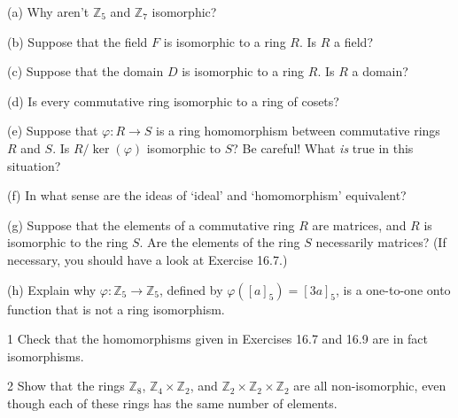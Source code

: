 \begin{problem}[Warmup]{(a)}
    Why aren't $\mathbb{Z}_5$ and $\mathbb{Z}_7$ isomorphic?
\end{problem}
\unsolved

\begin{problem}[Warmup]{(b)}
    Suppose that the field $F$ is isomorphic to a ring $R$. Is $R$ a field?
\end{problem}
\unsolved

\begin{problem}[Warmup]{(c)}
    Suppose that the domain $D$ is isomorphic to a ring $R$. Is $R$ a domain?
\end{problem}
\unsolved

\begin{problem}[Warmup]{(d)}
    Is every commutative ring isomorphic to a ring of cosets?
\end{problem}
\unsolved

\begin{problem}[Warmup]{(e)}
    Suppose that $\varphi : R \to S$ is a ring homomorphism between commutative rings $R$ and $S$. Is $R/\ker(\varphi)$ isomorphic to $S$? Be careful! What \emph{is} true in this situation?
\end{problem}
\unsolved

\begin{problem}[Warmup]{(f)}
    In what sense are the ideas of `ideal' and `homomorphism' equivalent?
\end{problem}
\unsolved

\begin{problem}[Warmup]{(g)}
    Suppose that the elements of a commutative ring $R$ are matrices, and $R$ is isomorphic to the ring $S$. Are the elements of the ring $S$ necessarily matrices? (If necessary, you should have a look at Exercise 16.7.)
\end{problem}
\unsolved

\begin{problem}[Warmup]{(h)}
    Explain why $\varphi : \mathbb{Z}_5 \to \mathbb{Z}_5$, defined by $\varphi([a]_5) = [3a]_5$, is a one-to-one onto function that is not a ring isomorphism.
\end{problem}
\unsolved

\begin{problem}{1}
    Check that the homomorphisms given in Exercises 16.7 and 16.9 are in fact
    isomorphisms.
\end{problem}
\unsolved

\begin{problem}{2}
Show that the rings $\mathbb{Z}_8$, $\mathbb{Z}_4 \times \mathbb{Z}_2$, and $\mathbb{Z}_2 \times \mathbb{Z}_2 \times \mathbb{Z}_2$ are all non-isomorphic, even though each of these rings has the same number of elements.
\end{problem}
\solved

